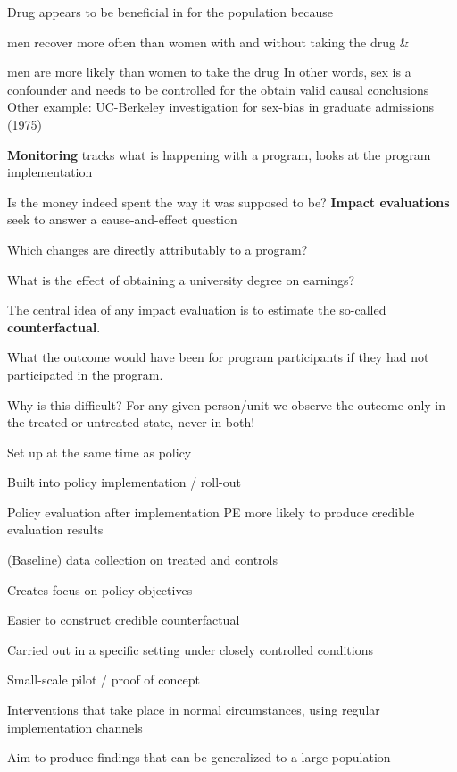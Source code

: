 \documentclass[
  25pt,         %
  a4paper,
  landscape,
  Screen4to3,
  footrule ]{foils}
\newcommand{\xx}{\item[{\small $\bullet$}]}
\begin{document}
\bi 
	\x Drug appears to be beneficial in for the population because
	\bi 
		\xx men recover more often than women with and without taking the drug \&
		\xx men are more likely than women to take the drug
	\ei
	\x In other words, sex is a confounder and needs to be controlled for the obtain valid causal conclusions
	\x Other example: UC-Berkeley investigation for sex-bias in graduate admissions (1975)
\ei



\bi
\x \textbf{Monitoring} tracks what is happening with a program, looks at the program implementation
\bi
\xx Is the money indeed spent the way it was supposed to be?
\ei
\x \textbf{Impact evaluations} seek to answer a cause-and-effect question
\bi
\xx Which changes are directly attributably to a program?
\xx What is the effect of obtaining a university degree on earnings?
\ei
\ei


The central idea of any impact evaluation is to estimate the so-called \textbf{counterfactual}.

What the outcome would have been for program participants if they had not participated in
the program.

Why is this difficult? For any given person/unit we observe the outcome only in the treated or untreated state, never in both!


\bi 
{}
\bi 
\xx Set up at the same time as policy
\xx Built into policy implementation / roll-out
\ei
{}
\bi 
\xx Policy evaluation after implementation
\ei
\x PE more likely to produce credible evaluation results
\bi 
\xx (Baseline) data collection on treated and controls
\xx Creates focus on policy objectives
\xx Easier to construct credible counterfactual
\ei
\ei


\bi 
{}
\bi 
\xx Carried out in a specific setting under closely controlled conditions
\xx Small-scale pilot / proof of concept
\ei
{}
\bi 
\xx Interventions that take place in normal circumstances, using regular implementation channels
\xx Aim to produce findings that can be generalized to a large population
\ei
\ei
\end{document}
